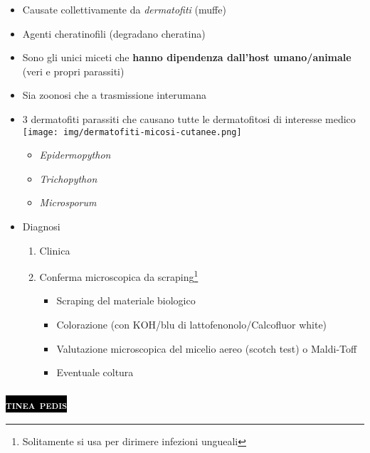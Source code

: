 \documentclass[italian,]{article}
\providecommand{\tightlist}{%
  \setlength{\itemsep}{0pt}\setlength{\parskip}{0pt}}
\newcommand{\pat}[1]{\colorbox{black}{\textcolor{white}{\textsc{#1}}}}
\begin{document}
\begin{itemize}
\tightlist
\item
  Causate collettivamente da \emph{dermatofiti} (muffe)
\item
  Agenti cheratinofili (degradano cheratina)
\item
  Sono gli unici miceti che \textbf{hanno dipendenza dall'host
  umano/animale} (veri e propri parassiti)
\item
  Sia zoonosi che a trasmissione interumana
\item
  3 dermatofiti parassiti che causano tutte le dermatofitosi di
  interesse medico\\
  \texttt{[image: img/dermatofiti-micosi-cutanee.png]}

  \begin{itemize}
  \tightlist
  \item
    \emph{Epidermopython}
  \item
    \emph{Trichopython}
  \item
    \emph{Microsporum}
  \end{itemize}
\item
  Diagnosi

  \begin{enumerate}
  \def\labelenumi{\arabic{enumi}.}
  \tightlist
  \item
    Clinica
  \item
    Conferma microscopica da scraping\footnote{Solitamente si usa per
      dirimere infezioni ungueali}

    \begin{itemize}
    \tightlist
    \item
      Scraping del materiale biologico
    \item
      Colorazione (con KOH/blu di lattofenonolo/Calcofluor white)
    \item
      Valutazione microscopica del micelio aereo (scotch test) o
      Maldi-Toff
    \item
      Eventuale coltura
    \end{itemize}
  \end{enumerate}
\end{itemize}

\hypertarget{section}{%
\subsubsection{\texorpdfstring{\pat{tinea pedis}}{}}\label{section}}
\end{document}
